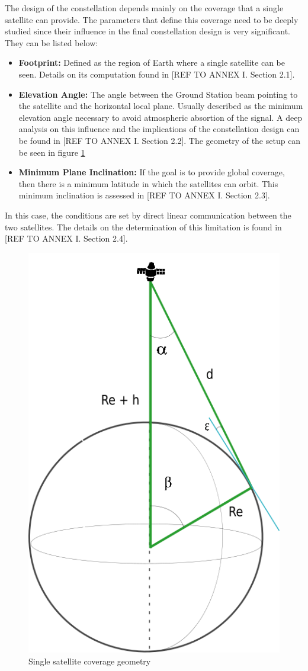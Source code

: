 The design of the constellation depends mainly on the coverage that a single satellite can provide. The parameters that define this coverage need to be deeply studied since their influence in the final constellation design is very significant. They can be listed below:

\begin{itemize}
\item \textbf{Footprint:} Defined as the region of Earth where a single satellite can
be seen. Details on its computation found in [{REF TO ANNEX I. Section 2.1}]. 
\item \textbf{Elevation Angle:} The angle between the Ground Station beam pointing to the satellite and the horizontal local plane. Usually described as the minimum elevation angle necessary to avoid atmospheric absortion of the signal. A deep analysis on this influence and the implications of the constellation design can be found in [{REF TO ANNEX I. Section 2.2}]. The geometry of the setup can be seen in figure \ref{fig:AngleSSatFoot}
\item \textbf{Minimum Plane Inclination: } If the goal is to provide global coverage, then there is a minimum latitude in which the satellites can orbit. This minimum inclination is assessed in [{REF TO ANNEX I. Section 2.3}].
\end{itemize}

In this case, the conditions are set by direct linear communication between the two satellites. The details on the determination of this limitation is found in [{REF TO ANNEX I. Section 2.4}].

\begin{figure}[H] %
	\centering
	\includegraphics[width=.3\textwidth]{./fig-Ch2-OrbitalCoverage/AngleSSatFoot.png}
	\caption{Single satellite coverage geometry}
	\label{fig:AngleSSatFoot}
	
\end{figure}